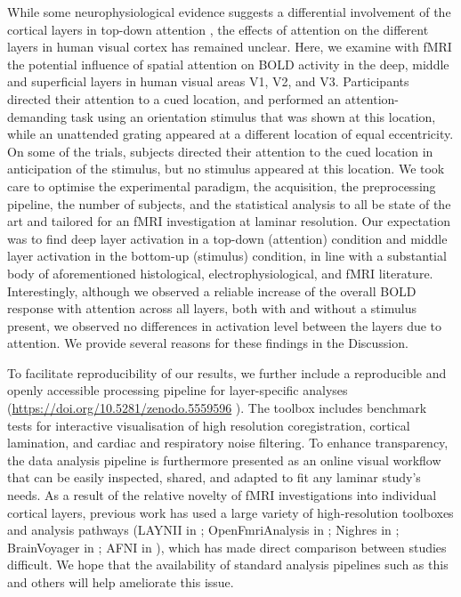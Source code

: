 \documentclass[9pt,lineno]{aperture}
\begin{document}
While some neurophysiological evidence suggests a differential involvement of the cortical layers in top-down attention \citep{Nandy2017, VanKerkoerle2017}, the effects of attention on the different layers in human visual cortex has remained unclear. Here, we examine with fMRI the potential influence of spatial attention on BOLD activity in the deep, middle and superficial layers in human visual areas V1, V2, and V3. Participants directed their attention to a cued location, and performed an attention-demanding task using an orientation stimulus that was shown at this location, while an unattended grating appeared at a different location of equal eccentricity. On some of the trials, subjects directed their attention to the cued location in anticipation of the stimulus, but no stimulus appeared at this location. 
We took care to optimise the experimental paradigm, the acquisition, the preprocessing pipeline, the number of subjects, and the statistical analysis to all be state of the art and tailored for an fMRI investigation at laminar resolution. Our expectation was to find deep layer activation in a top-down (attention) condition and middle layer activation in the bottom-up (stimulus) condition, in line with a substantial body of aforementioned histological, electrophysiological, and fMRI literature.
Interestingly, although we observed a reliable increase of the overall BOLD response with attention across all layers, both with and without a stimulus present, we observed no differences in activation level between the layers due to attention. We provide several reasons for these findings in the Discussion.

To facilitate reproducibility of our results, we further include a reproducible and openly accessible processing pipeline for layer-specific analyses (\url{https://doi.org/10.5281/zenodo.5559596} \citep{VanMourik2018}). The toolbox includes benchmark tests for interactive visualisation of high resolution coregistration, cortical lamination, and cardiac and respiratory noise filtering. To enhance transparency, the data analysis pipeline is furthermore presented as an online visual workflow that can be easily inspected, shared, and adapted to fit any laminar study’s needs. As a result of the relative novelty of fMRI investigations into individual cortical layers, previous work has used a large variety of high-resolution toolboxes and analysis pathways (LAYNII in \citet{Huber2017,Huber2018}; OpenFmriAnalysis in \citet{Lawrence2018}; Nighres in \citet{Huntenburg2018}; BrainVoyager in \citet{Goebel2012}; AFNI in \citet{Schallmo2021}), which has made direct comparison between studies difficult. We hope that the availability of standard analysis pipelines such as this and others \citep[][e.g.]{Gau2020,DeHollander2020} will help ameliorate this issue.
\end{document}
